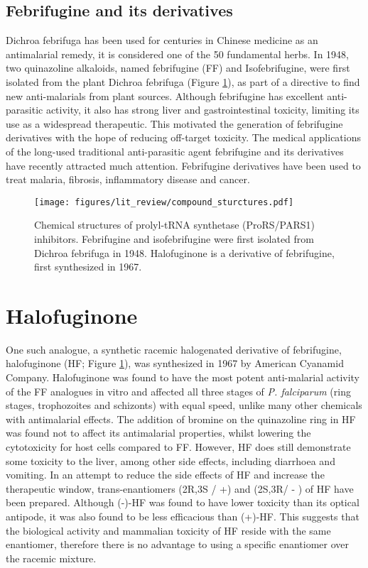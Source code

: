 \subsection{Febrifugine and its derivatives}\label{subsec:ff}
Dichroa febrifuga has been used for centuries in Chinese medicine as an antimalarial remedy, it is considered one of the 50 fundamental herbs.
In 1948, two quinazoline alkaloids, named febrifugine (FF) and Isofebrifugine, were first isolated from the plant Dichroa febrifuga (Figure \ref{fig:FF_IF_HF})\cite{koepfli1949alkaloids}, as part of a directive to find new anti-malarials from plant sources.
Although febrifugine has excellent anti-parasitic activity, it also has strong liver and gastrointestinal toxicity, limiting its use as a widespread therapeutic.
This motivated the generation of febrifugine derivatives with the hope of reducing off-target toxicity.
The medical applications of the long-used traditional anti-parasitic agent febrifugine and its derivatives have recently attracted much attention.
Febrifugine derivatives have been used to treat malaria, fibrosis, inflammatory disease and cancer.

\begin{figure}[htb]
\centering
\texttt{[image: figures/lit\_review/compound\_sturctures.pdf]}
\caption[Prolyl-tRNA synthetase inhibitor chemical structures]{Chemical structures of prolyl-tRNA synthetase (ProRS/PARS1) inhibitors.
Febrifugine and isofebrifugine were first isolated from Dichroa febrifuga in 1948.
Halofuginone is a derivative of febrifugine, first synthesized in 1967.
}
\label{fig:FF_IF_HF}\end{figure}

\section{Halofuginone}
One such analogue, a synthetic racemic halogenated derivative of febrifugine, halofuginone (HF; Figure \ref{fig:FF_IF_HF}), was synthesized in 1967 by American Cyanamid Company\cite{zhang2017novel}.
Halofuginone was found to have the most potent anti-malarial activity of the FF analogues in vitro and affected all three stages of \textit{P. falciparum} (ring stages, trophozoites and schizonts) with equal speed, unlike many other chemicals with antimalarial effects.
The addition of bromine on the quinazoline ring in HF was found not to affect its antimalarial properties, whilst lowering the cytotoxicity for host cells compared to FF.
However, HF does still demonstrate some toxicity to the liver, among other side effects, including diarrhoea and vomiting\cite{pines2015halofuginone}.
In an attempt to reduce the side effects of HF and increase the therapeutic window, trans-enantiomers (2R,3S / +)  and (2S,3R/ - ) of HF have been prepared.
Although (-)-HF was found to have lower toxicity than its optical antipode, it was also found to be less efficacious than (+)-HF\cite{mordechay2021differential, linder20072r}.
This suggests that the biological activity and mammalian toxicity of HF reside with the same enantiomer, therefore there is no advantage to using a specific enantiomer over the racemic mixture.

